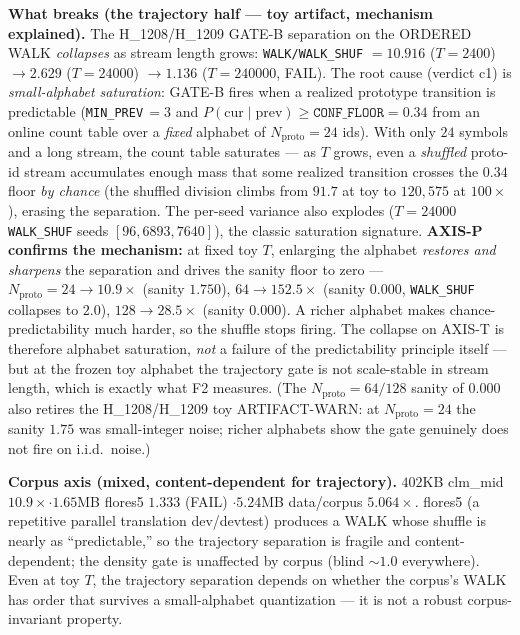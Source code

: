 \documentclass[11pt,a4paper]{article}
\begin{document}
\textbf{What breaks (the trajectory half --- toy artifact, mechanism explained).}
The H\_1208/H\_1209 GATE-B separation on the ORDERED WALK \emph{collapses} as
stream length grows: \texttt{WALK/WALK\_SHUF} $=10.916$ ($T{=}2400$) $\to 2.629$
($T{=}24000$) $\to 1.136$ ($T{=}240000$, FAIL). The root cause (verdict c1) is
\emph{small-alphabet saturation}: GATE-B fires when a realized prototype
transition is predictable (\texttt{MIN\_PREV}$\,=3$ and
$P(\text{cur}\mid\text{prev}) \ge \texttt{CONF\_FLOOR}=0.34$ from an online count
table over a \emph{fixed} alphabet of $N_{\text{proto}}{=}24$ ids). With only
$24$ symbols and a long stream, the count table saturates --- as $T$ grows, even a
\emph{shuffled} proto-id stream accumulates enough mass that some realized
transition crosses the $0.34$ floor \emph{by chance} (the shuffled division
climbs from $91.7$ at toy to $120{,}575$ at $100\times$), erasing the separation.
The per-seed variance also explodes ($T{=}24000$ \texttt{WALK\_SHUF} seeds
$[96, 6893, 7640]$), the classic saturation signature. \textbf{AXIS-P confirms
the mechanism:} at fixed toy $T$, enlarging the alphabet \emph{restores and
sharpens} the separation and drives the sanity floor to zero ---
$N_{\text{proto}}{=}24 \to 10.9\times$ (sanity $1.750$),
$64 \to 152.5\times$ (sanity $0.000$, \texttt{WALK\_SHUF} collapses to $2.0$),
$128 \to 28.5\times$ (sanity $0.000$). A richer alphabet makes
chance-predictability much harder, so the shuffle stops firing. The collapse on
AXIS-T is therefore alphabet saturation, \emph{not} a failure of the
predictability principle itself --- but at the frozen toy alphabet the trajectory
gate is not scale-stable in stream length, which is exactly what F2 measures.
(The $N_{\text{proto}}{=}64/128$ sanity of $0.000$ also retires the
H\_1208/H\_1209 toy ARTIFACT-WARN: at $N_{\text{proto}}{=}24$ the sanity $1.75$
was small-integer noise; richer alphabets show the gate genuinely does not fire
on i.i.d.\ noise.)

\textbf{Corpus axis (mixed, content-dependent for trajectory).} $402$KB clm\_mid
$10.9\times \cdot 1.65$MB flores5 $1.333$ (FAIL) $\cdot 5.24$MB data/corpus
$5.064\times$. flores5 (a repetitive parallel translation dev/devtest) produces a
WALK whose shuffle is nearly as ``predictable,'' so the trajectory separation is
fragile and content-dependent; the density gate is unaffected by corpus (blind
$\sim\!1.0$ everywhere). Even at toy $T$, the trajectory separation depends on
whether the corpus's WALK has order that survives a small-alphabet quantization
--- it is not a robust corpus-invariant property.
\end{document}
